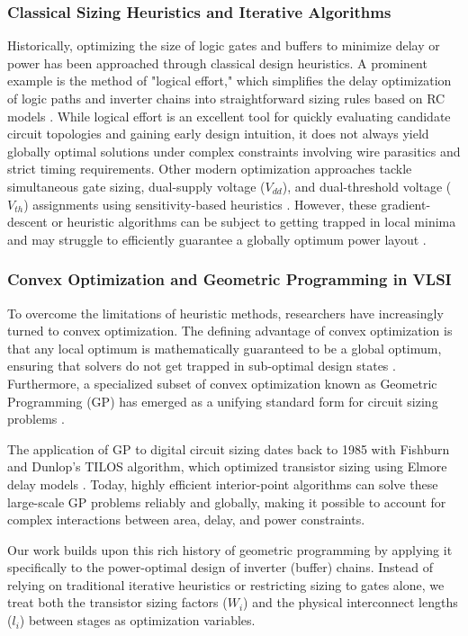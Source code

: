 \documentclass{article}
\begin{document}
	\subsubsection{Classical Sizing Heuristics and Iterative Algorithms}
		Historically, optimizing the size of logic gates and buffers to minimize delay or power has been 
		approached through classical design heuristics. A prominent example is the method of "logical 
		effort," which simplifies the delay optimization of logic paths and inverter chains into 
		straightforward sizing rules based on RC models \cite{gp}. While logical effort is an 
		excellent tool for quickly evaluating candidate circuit topologies and gaining early design 
		intuition, it does not always yield globally optimal solutions under complex constraints 
		involving wire parasitics and strict timing requirements. Other modern optimization 
		approaches tackle simultaneous gate sizing, dual-supply voltage ($V_{dd}$), and dual-threshold 
		voltage ($V_{th}$) assignments using sensitivity-based heuristics \cite{dual_vdd}. However, 
		these gradient-descent or heuristic algorithms can be subject to getting trapped in local 
		minima and may struggle to efficiently guarantee a globally optimum power layout \cite{dual_vdd}. 
	\subsubsection{Convex Optimization and Geometric Programming in VLSI}
		To overcome the limitations of heuristic methods, researchers have increasingly turned to convex 
		optimization. The defining advantage of convex optimization is that any local optimum is 
		mathematically guaranteed to be a global optimum, ensuring that solvers do not get trapped in 
		sub-optimal design states \cite{convex}. Furthermore, a specialized subset of convex optimization 
		known as Geometric Programming (GP) has emerged as a unifying standard form for circuit sizing 
		problems \cite{gp}.
	
	The application of GP to digital circuit sizing dates back to 1985 with Fishburn and Dunlop’s TILOS algorithm, 
	which optimized transistor sizing using Elmore delay models \cite{gp}. Today, highly efficient 
	interior-point algorithms can solve these large-scale GP problems reliably and globally, making it possible to 
	account for complex interactions between area, delay, and power constraints.

	Our work builds upon this rich history of geometric programming by applying it specifically to the power-optimal 
	design of inverter (buffer) chains. Instead of relying on traditional iterative heuristics or restricting sizing 
	to gates alone, we treat both the transistor sizing factors ($W_i$) and the physical interconnect 
	lengths ($l_i$) between stages as optimization variables.
\end{document}
